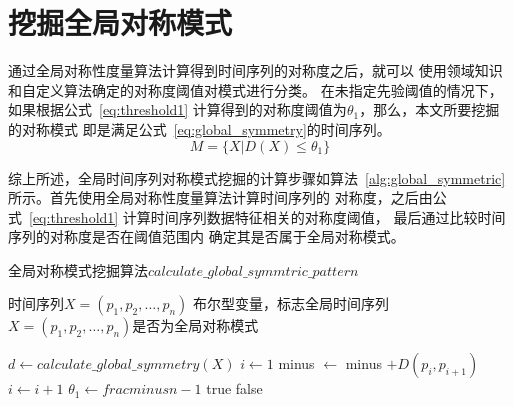 \section{挖掘全局对称模式}
通过全局对称性度量算法计算得到时间序列的对称度之后，就可以
使用领域知识和自定义算法确定的对称度阈值对模式进行分类。
在未指定先验阈值的情况下，如果根据公式~\ref{eq:threshold1}
计算得到的对称度阈值为$\theta_1$，那么，本文所要挖掘的对称模式
即是满足公式~\ref{eq:global_symmetry}的时间序列。
\begin{equation}
  M = \{X|D(X)\leq\theta_1\}
  \label{eq:global_symmetry}
\end{equation}

综上所述，全局时间序列对称模式挖掘的计算步骤如算法~\ref{alg:global_symmetric}
所示。首先使用全局对称性度量算法计算时间序列的
对称度，之后由公式~\ref{eq:threshold1}
计算时间序列数据特征相关的对称度阈值，
最后通过比较时间序列的对称度是否在阈值范围内
确定其是否属于全局对称模式。

\renewcommand{\algorithmicrequire}{\textbf{输入：}\unskip}
\renewcommand{\algorithmicensure}{\textbf{输出：}\unskip}
\begin{algorithm}
  \caption{全局对称模式挖掘算法$calculate\_global\_symmtric\_pattern$}
  \label{alg:global_symmetric}
  \small
  \begin{algorithmic}
    \REQUIRE 时间序列$X=\left(p_{1}, p_{2}, \dots, p_{n}\right)$
    \ENSURE 布尔型变量，标志全局时间序列$X=\left(p_{1},p_{2},\dots,p_n \right)$是否为全局对称模式

    \STATE $d \leftarrow calculate\_global\_symmetry(X) $
    \STATE $i \leftarrow 1$
    \STATE minus $\leftarrow$ minus $+D\left(p_{i}, p_{i+1}\right)$
    \STATE $i \leftarrow i+1$
    \ENDWHILE
    \STATE $\theta_1 \leftarrow frac{minus}{n-1}$
      \RETURN true
    \ELSE
      \RETURN false
    \ENDIF
  \end{algorithmic}
\end{algorithm}


